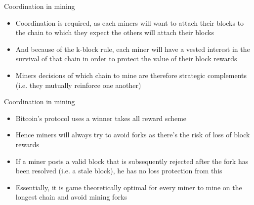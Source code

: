 \documentclass[9pt]{beamer}
\begin{document}

\begin{frame}{Coordination in mining}
	\begin{itemize}
		\item Coordination is required, as each miners will want to attach their blocks to the chain to which they expect the others will attach their blocks
		\item And because of the k-block rule, each miner will have a vested interest in the survival of that chain in order to protect the value of their block rewards
		\item Miners decisions of which chain to mine are therefore strategic complements (i.e. they mutually reinforce one another)
	\end{itemize}
\end{frame}



\begin{frame}{Coordination in mining}
	\begin{itemize}
		\item Bitcoin's protocol uses a winner takes all reward scheme
		\item Hence miners will always try to avoid forks as there's the risk of loss of block rewards
		\item If a miner posts a valid block that is subsequently rejected after the fork has been resolved (i.e. a stale block), he has no loss protection from this
		\item Essentially, it is game theoretically optimal for every miner to mine on the longest chain and avoid mining forks
	\end{itemize}
\end{frame}

\end{document}
